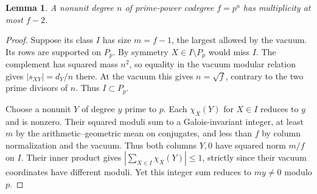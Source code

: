 \documentclass[11pt]{amsart}
\numberwithin{equation}{section}
\newtheorem{lemma}[theorem]{Lemma}
\begin{document}
\begin{lemma}\label{sq:saturation}
A nonunit degree $n$ of prime-power codegree $f=p^a$ has multiplicity at most $f-2$.
\end{lemma}
\begin{proof}
Suppose its class $I$ has size $m=f-1$, the largest allowed by the vacuum. Its rows are supported on $P_p$. By symmetry $X\in I\setminus P_p$ would miss $I$. The complement has squared mass $n^2$, so equality in the vacuum modular relation gives $|s_{XY}|=d_Y/n$ there. At the vacuum this gives $n=\sqrt f$, contrary to the two prime divisors of $n$. Thus $I\subset P_p$.

Choose a nonunit $Y$ of degree $y$ prime to $p$. Each $\chi_X(Y)$ for $X\in I$ reduces to $y$ and is nonzero. Their squared moduli sum to a Galois-invariant integer, at least $m$ by the arithmetic--geometric mean on conjugates, and less than $f$ by column normalization and the vacuum. Thus both columns $Y,0$ have squared norm $m/f$ on $I$. Their inner product gives $|\sum_{X\in I}\chi_X(Y)|\le1$, strictly since their vacuum coordinates have different moduli. Yet this integer sum reduces to $my\ne0$ modulo $p$.
\end{proof}
\end{document}
